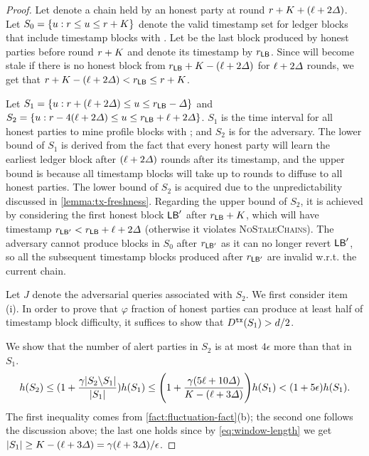 \begin{proof}
    Let \chain denote a chain held by an honest party at round $r + K + (\ell + 2\varDelta)$.
    Let $S_0 = \{u : r \le u \le r + K \}$ denote the valid timestamp set for ledger blocks that include timestamp blocks with \tx.
    Let \LB be the last block produced by honest parties before round $r + K$ and denote its timestamp by $r_\mathsf{LB}$.
    Since \chain will become stale if there is no honest block from $r_\mathsf{LB} + K - (\ell + 2\varDelta)$ for $\ell + 2\varDelta$ rounds, we get that $r + K - (\ell + 2\varDelta) < r_\mathsf{LB} \le r + K$.

    Let $S_1 = \{u : r + (\ell + 2\varDelta) \le u \le r_\mathsf{LB} - \varDelta \}$ and $S_2 = \{u : r - 4(\ell + 2\varDelta) \le u \le r_\mathsf{LB} + \ell + 2\varDelta \}$.
    $S_1$ is the time interval for all honest parties to mine profile blocks with \tx; and $S_2$ is for the adversary.
    The lower bound of $S_1$ is derived from the fact that every honest party will learn the earliest ledger block after $(\ell + 2\varDelta)$ rounds after its timestamp, and the upper bound is because all timestamp blocks will take up to \delay rounds to diffuse to all honest parties.
    The lower bound of $S_2$ is acquired due to the unpredictability discussed in \cref{lemma:tx-freshness}.
    Regarding the upper bound of $S_2$, it is achieved by considering the first honest block $\mathsf{LB}'$ after $r_\mathsf{LB} + K$, which will have timestamp $r_{\mathsf{LB}'} < r_\mathsf{LB} + \ell + 2\varDelta$ (otherwise it violates \textsc{NoStaleChains}).
    The adversary cannot produce blocks in $S_0$ after $r_{\mathsf{LB}'}$ as it can no longer revert $\mathsf{LB}'$, so all the subsequent timestamp blocks produced after $r_{\mathsf{LB}'}$ are invalid w.r.t. the current chain.

    Let $J$ denote the adversarial queries associated with $S_2$.
    We first consider item (i).
    In order to prove that $\varphi$ fraction of honest parties can produce at least half of timestamp block difficulty, it suffices to show that $D^{\mathtt{tx}}(S_1) > d / 2$.

    We show that the number of alert parties in $S_2$ is at most $4\epsilon$ more than that in $S_1$.
    \[ h(S_2) \le (1 + \frac{\gamma |S_2 \backslash S_1| }{|S_1|}) h(S_1) \le \Bigg(1 + \frac{\gamma (5\ell + 10\varDelta)}{K - (\ell + 3\varDelta)} \Bigg) h(S_1) < (1 + 5\epsilon) h(S_1). \]
    The first inequality comes from \cref{fact:fluctuation-fact}(b); the second one follows the discussion above; the last one holds since by \cref{eq:window-length} we get $|S_1| \ge K - (\ell + 3\varDelta) = \gamma (\ell + 3\varDelta) / \epsilon$.


\end{proof}
